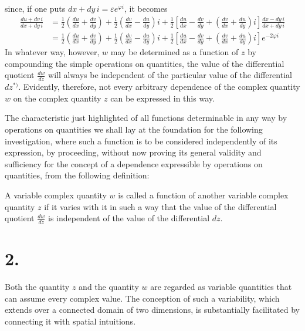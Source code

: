 \documentclass{article}
\begin{document}
since, if one puts $dx + dy\,i = \varepsilon e^{\varphi i}$, it becomes
\[
\begin{aligned}
\frac{du + dv\,i}{dx + dy\,i} &= \frac{1}{2}\left(\frac{du}{dx} + \frac{dv}{dy}\right) + \frac{1}{2}\left(\frac{dv}{dx} - \frac{du}{dy}\right)i + \frac{1}{2}\left[\frac{du}{dx} - \frac{dv}{dy} + \left(\frac{dv}{dx} + \frac{du}{dy}\right)i\right]\frac{dx - dy\,i}{dx + dy\,i} \\
&= \frac{1}{2}\left(\frac{du}{dx} + \frac{dv}{dy}\right) + \frac{1}{2}\left(\frac{dv}{dx} - \frac{du}{dy}\right)i + \frac{1}{2}\left[\frac{du}{dx} - \frac{dv}{dy} + \left(\frac{dv}{dx} + \frac{du}{dy}\right)i\right]e^{-2\varphi i}
\end{aligned}
\]
In whatever way, however, $w$ may be determined as a function of $z$ by compounding the simple operations on quantities, the value of the differential quotient $\frac{dw}{dz}$ will always be independent of the particular value of the differential $dz$${}^{*)}$. Evidently, therefore, not every arbitrary dependence of the complex quantity $w$ on the complex quantity $z$ can be expressed in this way.

The characteristic just highlighted of all functions determinable in any way by operations on quantities we shall lay at the foundation for the following investigation, where such a function is to be considered independently of its expression, by proceeding, without now proving its general validity and sufficiency for the concept of a dependence expressible by operations on quantities, from the following definition:

A variable complex quantity $w$ is called a function of another variable complex quantity $z$ if it varies with it in such a way that the value of the differential quotient $\frac{dw}{dz}$ is independent of the value of the differential $dz$.

\section*{2.}

Both the quantity $z$ and the quantity $w$ are regarded as variable quantities that can assume every complex value. The conception of such a variability, which extends over a connected domain of two dimensions, is substantially facilitated by connecting it with spatial intuitions.
\end{document}
